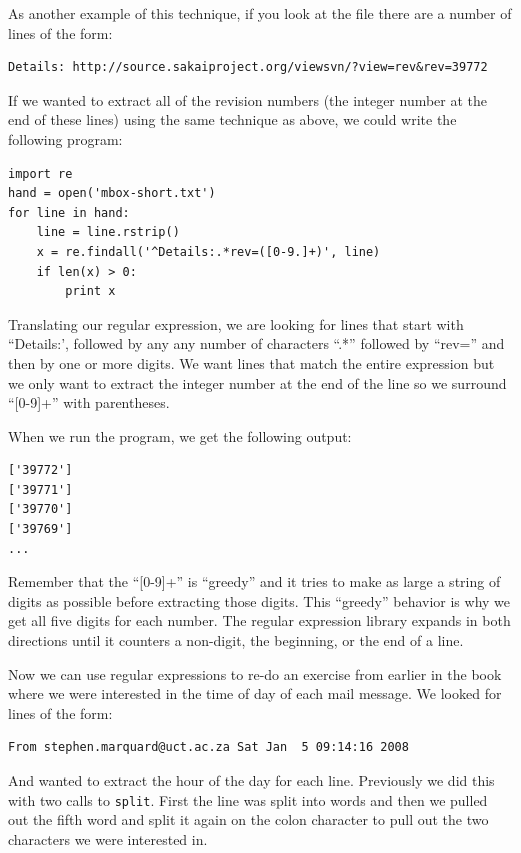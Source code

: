 \documentclass[10pt]{book}
\begin{document}
As another example of this technique, if 
you look at the file there are a number of lines of the form:

\beforeverb
\begin{verbatim}
Details: http://source.sakaiproject.org/viewsvn/?view=rev&rev=39772
\end{verbatim}
\afterverb
%
If we wanted to extract all of the revision numbers (the integer number at the end of these lines) using the same technique as above,  we could write the following program:

\beforeverb
\begin{verbatim}
import re
hand = open('mbox-short.txt')
for line in hand:
    line = line.rstrip()
    x = re.findall('^Details:.*rev=([0-9.]+)', line)
    if len(x) > 0:
        print x
\end{verbatim}
\afterverb
%
Translating our regular expression, we are looking for lines that start with ``Details:', followed by any any number of characters ``.*'' followed by ``rev='' and then by one or more digits.   We want lines that match the entire expression but we only want to extract the integer number at the end of the line so we surround ``[0-9]+'' with parentheses.  

When we run the program, we get the following output:

\beforeverb
\begin{verbatim}
['39772']
['39771']
['39770']
['39769']
...
\end{verbatim}
\afterverb
%
Remember that the ``[0-9]+'' is ``greedy'' and it tries to make as large a string of digits as possible before extracting those digits.  This ``greedy'' behavior is why we get all five digits for each number.  The regular expression library expands in both directions until it counters a non-digit, the beginning, or the end of a line.

Now we can use regular expressions to re-do an exercise from earlier in the book where we were interested in the time of day of each mail message.   We looked for lines of the form:

\beforeverb
\begin{verbatim}
From stephen.marquard@uct.ac.za Sat Jan  5 09:14:16 2008
\end{verbatim}
\afterverb
%
And wanted to extract the hour of the day for each line.  Previously we did this with two calls to {\tt split}.  First the line was split into words and then we pulled out the fifth word and split it again on the colon character to pull out the two characters we were interested in.
\end{document}
